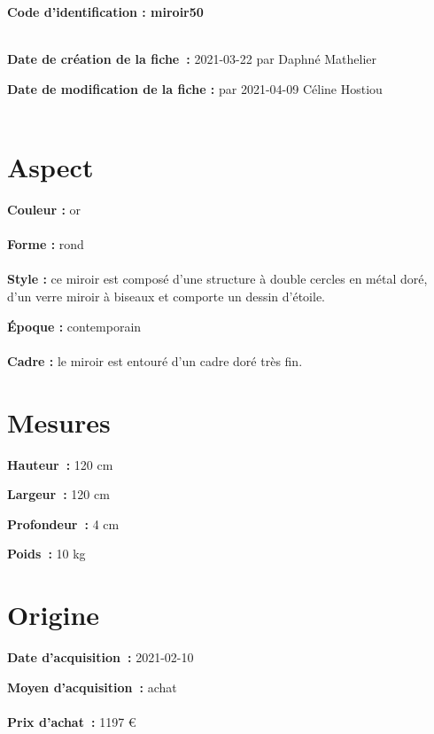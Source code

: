  
    
    
    {\bf \huge Code d’identification : miroir50}
    \\ \\ \hr
    \begin{center}
    \end{center}
    
    {\bf \large Date de création de la fiche :} 2021-03-22
    {par Daphné Mathelier}
  
    {\bf \large Date de modification de la fiche :} 
    {par 2021-04-09}
    Céline Hostiou \\ \\ \hr
    \section* {Aspect}
   {\bf \large Couleur :} or
    \\ \\ {\bf \large Forme :}  rond
    \\ \\ {\bf \large Style :} 
            ce miroir est composé d’une structure à double cercles en métal
                doré, d’un verre miroir à biseaux et comporte un dessin d’étoile.
        
        {\bf \large Époque :} contemporain
    \\ \\ {\bf \large Cadre :} 
            le miroir est entouré d’un cadre doré très fin.
        
    \section* {Mesures}
      
  {\bf \large Hauteur :} 120 cm
   
   {\bf \large Largeur :} 120 cm
    
   {\bf \large Profondeur :} 4 cm
    
   {\bf \large Poids :} 10 kg
     
    \section* {Origine}
    {\bf \large Date d’acquisition :} 2021-02-10

    {\bf \large Moyen d’acquisition :} achat
          \\ \\{\bf \large Prix d’achat :} 1197 €
        
